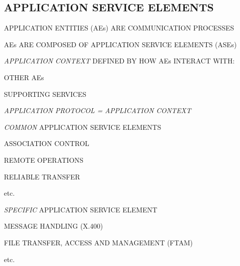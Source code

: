 \begin{bwslide}
\part	{APPLICATION SERVICE ELEMENTS}\bf
\end{bwslide}




\begin{bwslide}

\begin{nrtc}
\item	APPLICATION ENTITIES (AEs) ARE COMMUNICATION PROCESSES
\item	AEs ARE COMPOSED OF APPLICATION SERVICE ELEMENTS (ASEs)
\item	{\em APPLICATION CONTEXT} DEFINED BY HOW AEs INTERACT WITH:
	\begin{nrtc}
	\item	OTHER AEs
	\item	SUPPORTING SERVICES
	\end{nrtc}
\item	{\em APPLICATION PROTOCOL = APPLICATION CONTEXT}
\end{nrtc}
\end{bwslide}


\begin{bwslide}

\begin{nrtc}
\item	{\em COMMON} APPLICATION SERVICE ELEMENTS
	\begin{nrtc}
	\item	ASSOCIATION CONTROL
	\item	REMOTE OPERATIONS
	\item	RELIABLE TRANSFER
	\item	etc.
	\end{nrtc}
\item	{\em SPECIFIC} APPLICATION SERVICE ELEMENT
	\begin{nrtc}
	\item	MESSAGE HANDLING (X.400)
	\item	FILE TRANSFER, ACCESS AND MANAGEMENT (FTAM)
	\item	etc.
	\end{nrtc}
\end{nrtc}
\end{bwslide}


